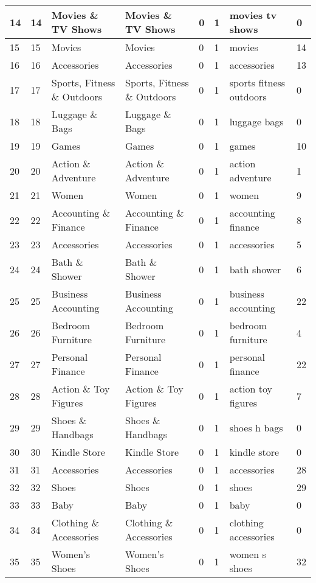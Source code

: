 \begin{longtable}{|l|l|l|l|l|l|l|l|}
14 & 14 & Movies \& TV Shows & Movies \& TV Shows & 0 & 1 & movies tv shows & 0 \\ \hline 
15 & 15 & Movies & Movies & 0 & 1 & movies & 14 \\ \hline 
16 & 16 & Accessories & Accessories & 0 & 1 & accessories & 13 \\ \hline 
17 & 17 & Sports, Fitness \& Outdoors & Sports, Fitness \& Outdoors & 0 & 1 & sports fitness outdoors & 0 \\ \hline 
18 & 18 & Luggage \& Bags & Luggage \& Bags & 0 & 1 & luggage bags & 0 \\ \hline 
19 & 19 & Games & Games & 0 & 1 & games & 10 \\ \hline 
20 & 20 & Action \& Adventure & Action \& Adventure & 0 & 1 & action adventure & 1 \\ \hline 
21 & 21 & Women & Women & 0 & 1 & women & 9 \\ \hline 
22 & 22 & Accounting \& Finance & Accounting \& Finance & 0 & 1 & accounting finance & 8 \\ \hline 
23 & 23 & Accessories & Accessories & 0 & 1 & accessories & 5 \\ \hline 
24 & 24 & Bath \& Shower & Bath \& Shower & 0 & 1 & bath shower & 6 \\ \hline 
25 & 25 & Business Accounting & Business Accounting & 0 & 1 & business accounting & 22 \\ \hline 
26 & 26 & Bedroom Furniture & Bedroom Furniture & 0 & 1 & bedroom furniture & 4 \\ \hline 
27 & 27 & Personal Finance & Personal Finance & 0 & 1 & personal finance & 22 \\ \hline 
28 & 28 & Action \& Toy Figures & Action \& Toy Figures & 0 & 1 & action toy figures & 7 \\ \hline 
29 & 29 & Shoes \& Handbags & Shoes \& Handbags & 0 & 1 & shoes h bags & 0 \\ \hline 
30 & 30 & Kindle Store & Kindle Store & 0 & 1 & kindle store & 0 \\ \hline 
31 & 31 & Accessories & Accessories & 0 & 1 & accessories & 28 \\ \hline 
32 & 32 & Shoes & Shoes & 0 & 1 & shoes & 29 \\ \hline 
33 & 33 & Baby & Baby & 0 & 1 & baby & 0 \\ \hline 
34 & 34 & Clothing \& Accessories & Clothing \& Accessories & 0 & 1 & clothing accessories & 0 \\ \hline 
35 & 35 & Women's Shoes & Women's Shoes & 0 & 1 & women s shoes & 32 \\ \hline 

\end{longtable}
